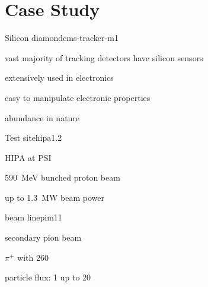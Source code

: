 \section{Case Study}
\begin{bframe}{Silicon \ra diamond}{cms-tracker-m}{1}
%
  \begin{bbox}{.45}
    \item vast majority of tracking detectors have silicon sensors
    \item extensively used in electronics
    \item easy to manipulate electronic properties
    \item abundance in nature
    \item<2> 
  \end{bbox}
%
\end{bframe}
\begin{bframe}{Test site}{hipa}{1.2}\hypersetup{linkcolor=white!70!black}
%
\vspace*{-.3\textheight}
\begin{bbox}{.45}
  \item \ac{HIPA} at \ac{PSI}
  \item \SI{590}{\MeV} bunched proton beam
  \item up to \SI{1.3}{\MW} beam power
\end{bbox}
%
%
\end{bframe}
\begin{bframe}{\pim beam line}{pim1}{1}
%
  \raggedleft
  \begin{bbox}{.42}
    \item secondary pion beam
    \item $\pi^+$ with \SI{260}{\mevc}
    \item particle flux: \SI{1}{\khzcm} up to \SI{20}{\mhzcm}
  \end{bbox}
%
%
\end{bframe}
